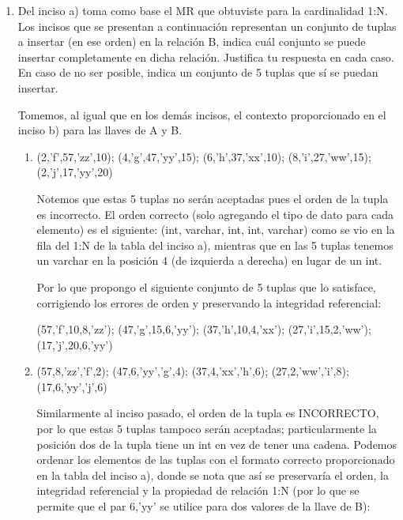 \begin{enumerate}[label=\textbf{\alph*.}]
\begin{enumerate}[label=\roman*.]
    \item (2,'ww', 57, 2); (4,'xx', 37, 4); (6,'yy', 17, 6); (8,'zz', 37, 8); (4,'xx', 47, 10)

    Esta tupla es totalmente correcta. Notemos que, siguiendo el orden de los atributos en la tabla anterior, los primeros dos elementos corresponden a un par válido en la tabla de A, el siguiente elemento también es un valor válido en la tabla de B, y el último elemento es un número, cumpliendo con el tipo de dato correspondiente al atributo ab1. Además, ninguna tupla se repite.
\end{enumerate}

    \item Del inciso a) toma como base el MR que obtuviste para la cardinalidad 1:N. Los incisos que se presentan a continuación representan un conjunto de tuplas a insertar (en ese orden) en la relación B, indica cuál conjunto se puede insertar completamente en dicha relación. Justifica tu respuesta en cada caso. En caso de no ser posible, indica un conjunto de 5 tuplas que sí se puedan insertar.

    Tomemos, al igual que en los demás incisos, el contexto proporcionado en el inciso b) para las llaves de A y B.
    \begin{enumerate}[label=\roman*.]
     \item (2,'f',57,'zz',10); (4,'g',47,'yy',15); (6,'h',37,'xx',10); (8,'i',27,'ww',15); (2,'j',17,'yy',20)
    
     Notemos que estas 5 tuplas no serán aceptadas pues el orden de la tupla es incorrecto. El orden correcto (solo agregando el tipo de dato para cada elemento) es el siguiente: (int, varchar, int, int, varchar) como se vio en la fila del 1:N de la tabla del inciso a), mientras que en las 5 tuplas tenemos un varchar en la posición 4 (de izquierda a derecha) en lugar de un int.

     Por lo que propongo el siguiente conjunto de 5 tuplas que lo satisface, corrigiendo los errores de orden y preservando la integridad referencial:
     
     (57,'f',10,8,'zz'); (47,'g',15,6,'yy'); (37,'h',10,4,'xx'); (27,'i',15,2,'ww'); (17,'j',20,6,'yy')

    \vspace{.5cm}
    \item (57,8,'zz','f',2); (47,6,'yy','g',4); (37,4,'xx','h',6); (27,2,'ww','i',8); (17,6,'yy','j',6)
    
    Similarmente al inciso pasado, el orden de la tupla es INCORRECTO, por lo que estas 5 tuplas tampoco serán aceptadas; particularmente la posición dos de la tupla tiene un int en vez de tener una cadena. Podemos ordenar los elementos de las tuplas con el formato correcto proporcionado en la tabla del inciso a), donde se nota que así se preservaría el orden, la integridad referencial y la propiedad de relación 1:N (por lo que se permite que el par 6,'yy' se utilice para dos valores de la llave de B):


\end{enumerate}
\end{enumerate}
